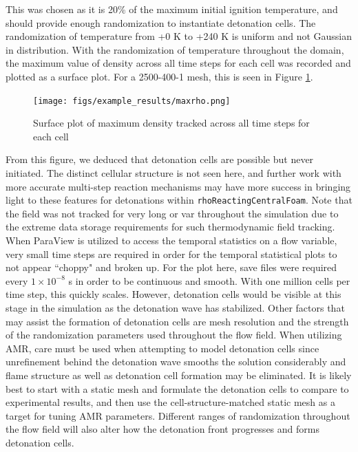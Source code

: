 \noindent This was chosen as it is 20\% of the maximum initial ignition temperature, and should provide enough randomization to instantiate detonation cells. The randomization of temperature from +0 K to +240 K is uniform and not Gaussian in distribution. With the randomization of temperature throughout the domain, the maximum value of density across all time steps for each cell was recorded and plotted as a surface plot. 
For a 2500-400-1 mesh, this is seen in Figure \ref{fig:maxrho}.
\begin{figure}[h]
\centering
\texttt{[image: figs/example\_results/maxrho.png]}
\caption{Surface plot of maximum density tracked across all time steps for each cell }
\label{fig:maxrho}
\end{figure}
From this figure, we deduced that detonation cells are possible but never initiated. The distinct cellular structure is not seen here, and further work with more accurate multi-step reaction mechanisms may have more success in bringing light to these features for detonations within \verb|rhoReactingCentralFoam|. Note that the field was not tracked for very long or var throughout the simulation due to the extreme data storage requirements for such thermodynamic field tracking. When ParaView is utilized to access the temporal statistics on a flow variable, very small time steps are required in order for the temporal statistical plots to not appear ``choppy" and broken up. For the plot here, save files were required every \(1 \times 10^{ - 8}\) s in order to be continuous and smooth. With one million cells per time step, this quickly scales. However, detonation cells would be visible at this stage in the simulation as the detonation wave has stabilized. Other factors that may assist the formation of detonation cells are mesh resolution and the strength of the randomization parameters used throughout the flow field. When utilizing AMR, care must be used when attempting to model detonation cells since unrefinement behind the detonation wave smooths the solution considerably and flame structure as well as detonation cell formation may be eliminated. It is likely best to start with a static mesh and formulate the detonation cells to compare to experimental results, and then use the cell-structure-matched static mesh as a target for tuning AMR parameters. Different ranges of randomization throughout the flow field will also alter how the detonation front progresses and forms detonation cells. 



